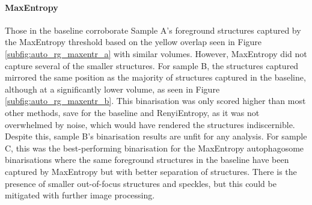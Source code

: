 \FloatBarrier
\paragraph{MaxEntropy}
Those in the baseline corroborate Sample A's foreground structures captured by the MaxEntropy threshold based on the yellow overlap seen in Figure \ref{subfig:auto_rg_maxentr_a} with similar volumes. However, MaxEntropy did not capture several of the smaller structures. For sample B, the structures captured mirrored the same position as the majority of structures captured in the baseline, although at a significantly lower volume, as seen in Figure \ref{subfig:auto_rg_maxentr_b}. This binarisation was only scored higher than most other methods, save for the baseline and RenyiEntropy, as it was not overwhelmed by noise, which would have rendered the structures indiscernible. Despite this, sample B's binarisation results are unfit for any analysis. For sample C, this was the best-performing binarisation for the MaxEntropy autophagosome binarisations where the same foreground structures in the baseline have been captured by MaxEntropy but with better separation of structures. There is the presence of smaller out-of-focus structures and speckles, but this could be mitigated with further image processing.

